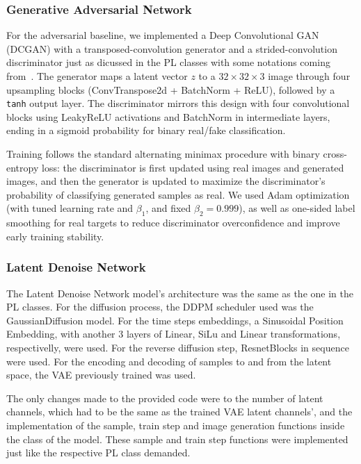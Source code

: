 \documentclass[runningheads]{llncs}
\begin{document}
\subsubsection{Generative Adversarial Network}
For the adversarial baseline, we implemented a Deep Convolutional GAN (DCGAN) with a 
transposed-convolution generator and a strided-convolution discriminator just as dicussed in
the PL classes with some notations coming from~\cite{dcgan}. 
The generator maps a latent vector $z$ to a $32\times32\times3$ image through 
four upsampling blocks (ConvTranspose2d + BatchNorm + ReLU), followed by a \texttt{tanh} output layer. 
The discriminator mirrors this design with four convolutional blocks using LeakyReLU activations and 
BatchNorm in intermediate layers, ending in a sigmoid probability for binary real/fake classification.

Training follows the standard alternating minimax procedure with binary cross-entropy loss: 
the discriminator is first updated using real images and generated images, and then the 
generator is updated to maximize the discriminator's probability of classifying generated 
samples as real. We used Adam optimization (with tuned learning rate and $\beta_1$, and 
fixed $\beta_2=0.999$), as well as one-sided label smoothing for real targets to reduce 
discriminator overconfidence and improve early training stability. 

\subsubsection{Latent Denoise Network}

The Latent Denoise Network model's architecture was the same as the one in the PL classes.
For the diffusion process, the DDPM scheduler used was the GaussianDiffusion model.
For the time steps embeddings, a Sinusoidal Position Embedding, with another 3 layers of Linear, SiLu and Linear transformations, respectivelly, were used.
For the reverse diffusion step, ResnetBlocks in sequence were used.
For the encoding and decoding of samples to and from the latent space, the VAE previously trained was used.

The only changes made to the provided code were to the number of latent channels, which had to be the same as the trained VAE latent channels', 
and the implementation of the sample, train step and image generation functions inside the class of the model.
These sample and train step functions were implemented just like the respective PL class demanded.
\end{document}
